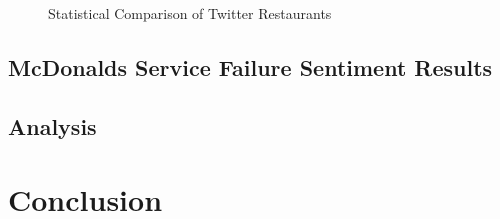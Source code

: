 \documentclass[titlepage,letterpaper]{article}
\begin{document}
\begin{figure}[htb]
	\centering
	\caption{Statistical Comparison of Twitter Restaurants}
	
	\label{compstat}
\end{figure}


\subsection{McDonalds Service Failure Sentiment Results}

\subsection{Analysis}

\section{Conclusion}


\clearpage


\printbibliography
\end{document}
